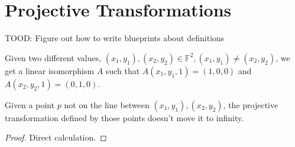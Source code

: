 \chapter{Projective Transformations}
\label{chap:proj}

TOOD: Figure out how to write blueprints about definitions

\begin{definition}
    \label{projective_transform}
    \leanok
    Given two different values, $(x_1, y_1), (x_2, y_2) \in \mathbb{F}^2, (x_1, y_1) \neq (x_2, y_2)$, we get a linear isomorphism $A$ such that
    $A (x_1, y_1, 1) = (1, 0, 0)$ and $A (x_2, y_2, 1) = (0, 1, 0)$.
\end{definition}

\begin{lemma}
    \label{non_erasing}
    \leanok
    Given a point $p$ not on the line between $(x_1, y_1), (x_2, y_2)$, the projective transformation defined
    by those points doesn't move it to infinity.
\end{lemma}

\begin{proof}
    Direct calculation.
\end{proof}